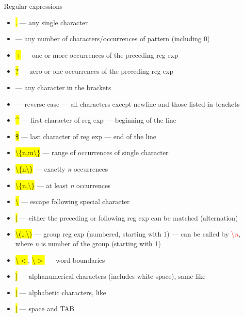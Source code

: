 \documentclass[compress, ucs, xelatex, 11pt, xcolor=svgnames,
  hyperref={
    bookmarks=true,
    unicode=true,
    colorlinks=true,
    pdftitle={Linux, command line and MetaCentrum},
    plainpages=false,
    pdfauthor={Vojtech Zeisek},
    pdfsubject={Course about use of Linux command line, writing shell scripts and using MetaCentrum of CESNET},
    pdfcreator={XeLaTeX},
    pdfkeywords={Linux, GNU, BASH, shell, command line, MetaCentrum},
    linkcolor=DarkRed,
    anchorcolor=DarkBlue,
    citecolor=Indigo,
    filecolor=NavyBlue,
    menucolor=DarkMagenta,
    urlcolor=DarkBlue,
    pdftex},
  url={hyphens, lowtilde} %
  ]{beamer}
\renewcommand{\texttt}[1]{\hl{\ttfamily #1}}
\renewcommand{\alert}[1]{\textcolor{red}{#1}}
\begin{document}
\begin{frame}[allowframebreaks]{Regular expressions}
  \label{regexp}
  \begin{itemize}
    \item \alert{\texttt{.}} --- any single character
    \item \alert{\texttt{*}} --- any number of characters/occurrences of pattern (including 0)
    \item \alert{\texttt{+}} --- one or more occurrences of the preceding reg exp
    \item \alert{\texttt{?}} --- zero or one occurrences of the preceding reg exp
    \item \alert{\texttt{[\ldots]}} --- any character in the brackets
    \item \alert{\texttt{[\textasciicircum\ldots]}} --- reverse case --- all characters except newline and those listed in brackets
    \item \alert{\texttt{\textasciicircum}} --- first character of reg exp --- beginning of the line
    \item \alert{\texttt{\$}} --- last character of reg exp --- end of the line
    \item \alert{\texttt{\textbackslash\{n,m\textbackslash\}}} --- range of occurrences of single character
    \item \alert{\texttt{\textbackslash\{n\textbackslash\}}} --- exactly \textit{n} occurrences
    \item \alert{\texttt{\textbackslash\{n,\textbackslash\}}} --- at least \textit{n} occurrences
    \item \alert{\texttt{\textbackslash}} --- escape following special character
    \item \alert{\texttt{|}} --- either the preceding or following reg exp can be matched (alternation)
    \item \alert{\texttt{\textbackslash(\ldots\textbackslash)}} --- group reg exp (numbered, starting with 1) --- can be called by \alert{\textbackslash\textit{n}}, where \textit{n} is number of the group (starting with 1)
    \item \alert{\texttt{\textbackslash$<$}}, \alert{\texttt{\textbackslash$>$}} --- word boundaries
    \item \alert{\texttt{[[:alnum:]]}} --- alphanumerical characters (includes white space), same like \alert{\texttt{[a-zA-Z0-9]}}
    \item \alert{\texttt{[[:alpha:]]}} --- alphabetic characters, like \alert{\texttt{[a-zA-Z]}}
    \item \alert{\texttt{[[:blank:]]}} --- space and TAB

\end{itemize}
\end{frame}
\end{document}

